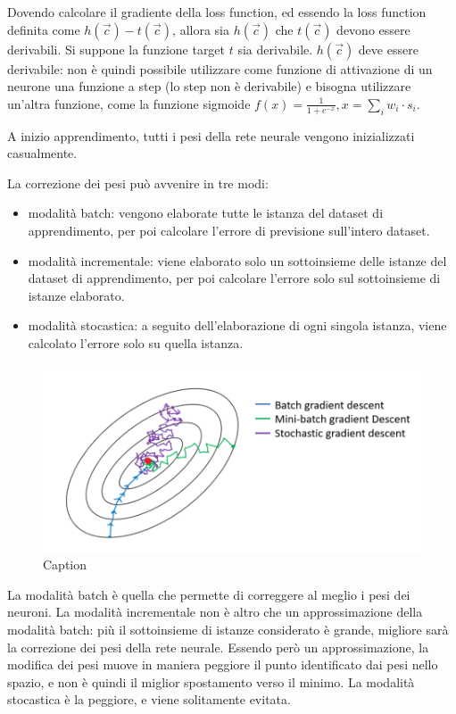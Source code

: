 Dovendo calcolare il gradiente della loss function, ed essendo la loss function
definita come $h(\Vec{c}) - t(\Vec{c})$, allora sia $h(\Vec{c})$ che
$t(\Vec{c})$ devono essere derivabili. Si suppone la funzione target $t$ sia 
derivabile. $h(\Vec{c})$ deve essere derivabile: non è quindi possibile
utilizzare come funzione di attivazione di un neurone una funzione a step
(lo step non è derivabile) e bisogna utilizzare un'altra funzione, come la
funzione sigmoide $f(x) = \frac{1}{1+e^{-x}}, x = \sum_i w_i \cdot s_i$.

A inizio apprendimento, tutti i pesi della rete neurale vengono inizializzati
casualmente.

La correzione dei pesi può avvenire in tre modi:
\begin{itemize}
    \item modalità batch: vengono elaborate tutte le istanza del dataset di
    apprendimento, per poi calcolare l'errore di previsione sull'intero dataset.
    \item modalità incrementale: viene elaborato solo un sottoinsieme delle
    istanze del dataset di apprendimento, per poi calcolare l'errore solo sul
    sottoinsieme di istanze elaborato.
    \item modalità stocastica: a seguito dell'elaborazione di ogni singola
    istanza, viene calcolato l'errore solo su quella istanza.
\end{itemize}
\begin{figure}
    \centering
    \includegraphics[width=0.75\linewidth]{img/gradient_descent.png}
    \caption{Caption}
    \label{fig:gradient_descent}
\end{figure}
La modalità batch è quella che permette di correggere al meglio i pesi dei
neuroni. La modalità incrementale non è altro che un approssimazione della
modalità batch: più il sottoinsieme di istanze considerato è grande, migliore
sarà la correzione dei pesi della rete neurale. Essendo però un approssimazione,
la modifica dei pesi muove in maniera peggiore il punto identificato dai pesi
nello spazio, e non è quindi il miglior spostamento verso il minimo.
La modalità stocastica è la peggiore, e viene solitamente evitata.

